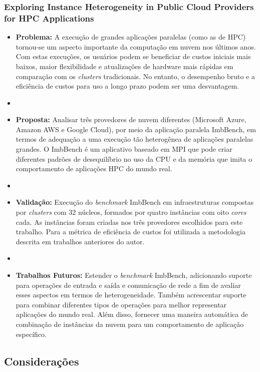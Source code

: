 \documentclass[tese,capa]{texufpel}
\begin{document}
\subsubsection{Exploring Instance Heterogeneity in Public Cloud Providers for HPC Applications \cite{roloffExploringInstanceHeterogeneity2019a}}

\begin{itemize}[label={},noitemsep]
  \item \textbf{Problema:} A execução de grandes aplicações paralelas (como as de HPC) tornou-se um aspecto importante da computação em nuvem nos últimos anos. Com estas execuções, os usuários podem se beneficiar de custos iniciais mais baixos, maior flexibilidade e atualizações de hardware mais rápidas em comparação com os \textit{clusters} tradicionais. No entanto, o desempenho bruto e a eficiência de custos para uso a longo prazo podem ser uma desvantagem.
  \item 
  \item \textbf{Proposta:} Analisar três provedores de nuvem diferentes (Microsoft Azure, Amazon AWS e Google Cloud), por meio da aplicação paralela ImbBench, em termos de adequação a uma execução tão heterogênea de aplicações paralelas grandes. O ImbBench é um aplicativo baseado em MPI que pode criar diferentes padrões de desequilíbrio no uso da CPU e da memória que imita o comportamento de aplicações HPC do mundo real.
  \item 
  \item \textbf{Validação:} Execução do \textit{benchmark} ImbBench em infraestruturas compostas por \textit{clusters} com 32 núcleos, formados por quatro instâncias com oito \textit{cores} cada. As instâncias foram criadas nos três provedores escolhidos para este trabalho. Para a métrica de eficiência de custos foi utilizada a metodologia descrita em trabalhos anteriores do autor.
  \item 
  \item \textbf{Trabalhos Futuros:} Estender o \textit{benchmark} ImbBench, adicionando suporte para operações de entrada e saída e comunicação de rede a fim de avaliar esses aspectos em termos de heterogeneidade. Também acrescentar suporte para combinar diferentes tipos de operações para melhor representar aplicações do mundo real. Além disso, fornecer uma maneira automática de combinação de instâncias da nuvem para um comportamento de aplicação específico.
\end{itemize}

\subsection{Considerações}
\end{document}
